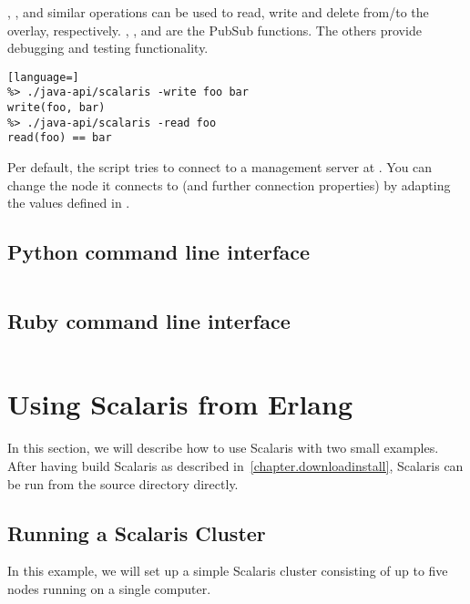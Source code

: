 , ,  and similar operations can be used to read, write
and delete from/to the overlay, respectively. ,
, and  are the PubSub functions. The others
provide debugging and testing functionality.

\begin{lstlisting}[language=]
%> ./java-api/scalaris -write foo bar
write(foo, bar)
%> ./java-api/scalaris -read foo
read(foo) == bar
\end{lstlisting}

Per default, the  script tries to connect to a management
server at . You can change the node it connects to (and
further connection properties) by adapting the values defined in
.

\subsection{Python command line interface}

\begin{lstlisting}[language=sh]
%> ./python-api/scalaris_client.py --help
\end{lstlisting}


\subsection{Ruby command line interface}

\begin{lstlisting}[language=sh]
%> ../ruby-api/scalaris_client.rb --help
\end{lstlisting}


\section{Using Scalaris from Erlang}
\label{chapter.systemuse.usingfromerl}
In this section, we will describe how to use Scalaris with two small examples. After
having build Scalaris as described in~\ref{chapter.downloadinstall}, Scalaris can be run
from the source directory directly.

\subsection{Running a Scalaris Cluster}
In this example, we will set up a simple Scalaris cluster consisting of up to five nodes
running on a single computer.


